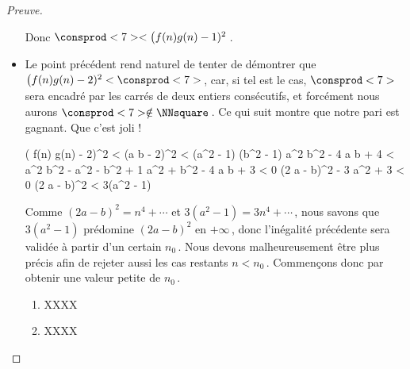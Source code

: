 \begin{proof}[Preuve]
\begin{itemize}
        \medskip
        
        \noindent
        Donc $\consprod<7> < \big( f(n) g(n) - 1)^2$\,.


		\item Le point précédent rend naturel de tenter de démontrer que $\big( f(n) g(n) - 2)^2 < \consprod<7>$\,, car, si tel est le cas, $\consprod<7>$ sera encadré par les carrés de deux entiers consécutifs, et forcément nous aurons $\consprod<7> \notin \NNsquare$\,. 
		Ce qui suit montre que notre pari est gagnant. Que c'est joli !

        \medskip
        \noindent\kern-6pt%
        \begin{stepcalc}[style = ar*, ope={\iff}]
        	\big( f(n) g(n) - 2)^2 < \consprod<7>
        	(a b - 2)^2 < (a^2 - 1) (b^2 - 1)
        \explnext{}
        	a^2 b^2 - 4 a b + 4 < a^2 b^2 - a^2 - b^2 + 1
        \explnext{}
        	a^2 + b^2 - 4 a b + 3 < 0
        	(2 a - b)^2 - 3 a^2 + 3 < 0
        \explnext{}
        	(2 a - b)^2 < 3(a^2 - 1)
        \end{stepcalc}

        \medskip
        \noindent
        Comme $(2a - b)^2 = n^4 + \cdots$ et $3(a^2 - 1) = 3 n^4 + \cdots$\,, nous savons que $3(a^2 - 1)$ prédomine $(2a - b)^2$ en $+\infty$\,, donc l'inégalité précédente sera validée à partir d'un certain $n_0$\,.
        Nous devons malheureusement être plus précis afin de rejeter aussi les cas restants $n < n_0$\,.
        Commençons donc par obtenir une valeur petite de $n_0$\,.
        \begin{enumerate}
        	\item XXXX

        	\item XXXX
        \end{enumerate}
	\end{itemize}
\end{proof}

